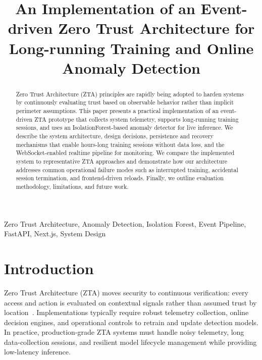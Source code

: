 \documentclass[conference]{IEEEtran}
\begin{document}
\title{An Implementation of an Event-driven Zero Trust Architecture for Long-running Training and Online Anomaly Detection}

\author{
}

\maketitle

\begin{abstract}
Zero Trust Architecture (ZTA) principles are rapidly being adopted to harden systems by continuously evaluating trust based on observable behavior rather than implicit perimeter assumptions. This paper presents a practical implementation of an event-driven ZTA prototype that collects system telemetry, supports long-running training sessions, and uses an IsolationForest-based anomaly detector for live inference. We describe the system architecture, design decisions, persistence and recovery mechanisms that enable hours-long training sessions without data loss, and the WebSocket-enabled realtime pipeline for monitoring. We compare the implemented system to representative ZTA approaches and demonstrate how our architecture addresses common operational failure modes such as interrupted training, accidental session termination, and frontend-driven reloads. Finally, we outline evaluation methodology, limitations, and future work.
\end{abstract}

\begin{IEEEkeywords}
Zero Trust Architecture, Anomaly Detection, Isolation Forest, Event Pipeline, FastAPI, Next.js, System Design
\end{IEEEkeywords}

\section{Introduction}
Zero Trust Architecture (ZTA) moves security to continuous verification: every access and action is evaluated on contextual signals rather than assumed trust by location~\cite{nist800207}. Implementations typically require robust telemetry collection, online decision engines, and operational controls to retrain and update detection models. In practice, production-grade ZTA systems must handle noisy telemetry, long data-collection sessions, and resilient model lifecycle management while providing low-latency inference.
\end{document}
